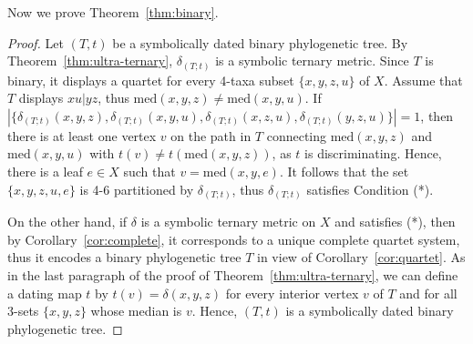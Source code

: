 \documentclass{article}
\begin{document}
Now we prove Theorem~\ref{thm:binary}.

\begin{proof}

Let $(T,t)$ be a symbolically dated binary phylogenetic tree. 
By Theorem~\ref{thm:ultra-ternary}, $\delta_{(T;t)}$ is a
symbolic ternary metric. Since $T$ is binary, it displays a 
quartet for every 4-taxa subset $\{x,y,z,u\}$ of $X$. Assume 
that $T$ displays $xu|yz$, thus 
$\text{med}(x,y,z) \neq \text{med}(x,y,u)$. If 
$|\{\delta_{(T;t)}(x,y,z),\delta_{(T;t)}(x,y,u),\delta_{(T;t)}(x,z,u),\delta_{(T;t)}(y,z,u)\}|= 1$, 
then \\there is at least one vertex $v$ on the path in $T$ connecting 
$\text{med}(x,y,z)$ and $\text{med}(x,y,u)$ with $t(v) \neq t(\text{med}(x,y,z))$, as 
$t$ is discriminating. Hence, there is a leaf $e \in X$ such that
$v = \text{med}(x,y,e)$. 
It follows that the set $\{x,y,z,u,e\}$ is 4-6 partitioned by $\delta_{(T;t)}$, 
thus $\delta_{(T;t)}$ satisfies Condition (*).



On the other hand, if $\delta$ is a symbolic 
ternary metric on $X$  and satisfies (*),
then by Corollary~\ref{cor:complete}, it corresponds to a unique complete 
quartet system, thus it encodes a binary phylogenetic tree $T$ in view of 
Corollary~\ref{cor:quartet}. 
As in the last paragraph of the proof of 
Theorem~\ref{thm:ultra-ternary}, we can define a 
dating map $t$ by $t(v)=\delta(x,y,z)$ for every interior vertex $v$ of $T$ and for all 
3-sets $\{x,y,z\}$ whose median is $v$. Hence, $(T,t)$ is a symbolically dated binary 
phylogenetic tree.  
\end{proof}

%
%
%
%
%
\end{document}
